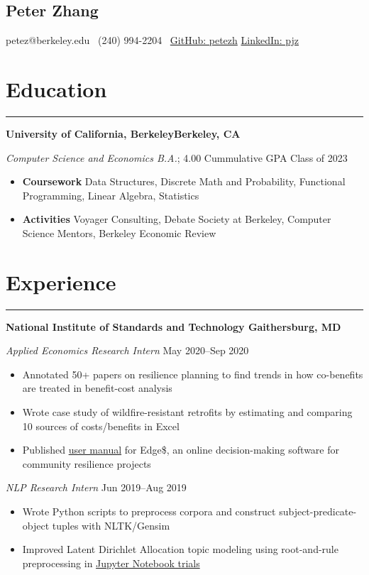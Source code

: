 \documentclass[11pt]{article}
\newcommand{\name}[1]{\begin{center}\section*{\huge \color{highlight} #1}\end{center}}
\newcommand{\topinfo}[1]{\begin{center}\vspace{-0.2cm}#1\vspace{-0.2cm}\end{center}}
\newcommand{\resumesection}[1]{\vspace{-0.3cm}\section*{\color{highlight}#1}\vspace{-0.3cm}\hrule\vspace{0.3cm}}
\begin{document}
\name{Peter Zhang}
\topinfo{petez@berkeley.edu \textbullet\ (240) 994-2204 \textbullet\ \href{https://github.com/petezh}{GitHub: petezh}  \textbullet  \href{https://www.linkedin.com/in/pjz/}{ LinkedIn: pjz}}

\resumesection{Education}

\textbf{University of California, Berkeley\hfill Berkeley, CA} \par
\textit{Computer Science and Economics B.A.}; 4.00 Cummulative GPA \hfill Class of 2023
\begin{itemize}
	\item \textbf{Coursework} Data Structures, Discrete Math and Probability, Functional Programming, Linear Algebra, Statistics
	\item \textbf{Activities} Voyager Consulting, Debate Society at Berkeley, Computer Science Mentors, Berkeley Economic Review
\end{itemize}

\resumesection{Experience}

\textbf{National Institute of Standards and Technology \hfill Gaithersburg, MD}\par

\textit{Applied Economics Research Intern} \hfill May 2020--Sep 2020
\begin{itemize}
	\item Annotated 50+ papers on resilience planning to find trends in how co-benefits are treated in benefit-cost analysis
	\item Wrote case study of wildfire-resistant retrofits by estimating and comparing 10 sources of costs/benefits in Excel
	\item Published \href{https://nvlpubs.nist.gov/nistpubs/SpecialPublications/NIST.SP.1260.pdf}{user manual} for Edge\$, an online decision-making software for community resilience projects
\end{itemize}\par

\textit{NLP Research Intern} \hfill Jun 2019--Aug 2019
\begin{itemize}
	\item Wrote Python scripts to preprocess corpora and construct subject-predicate-object tuples with NLTK/Gensim
	\item Improved Latent Dirichlet Allocation topic modeling using root-and-rule preprocessing in \href{https://github.com/petezh/RR-NLP-Tools}{Jupyter Notebook trials}
\end{itemize}\vspace{0.1cm}
\end{document}
